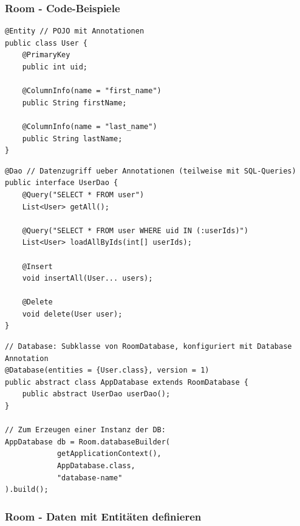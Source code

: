\documentclass[a4paper]{article}
\begin{document}
\newpage

\subsubsection{Room - Code-Beispiele}

\begin{lstlisting}
@Entity // POJO mit Annotationen
public class User {
	@PrimaryKey
	public int uid;
	
	@ColumnInfo(name = "first_name")
	public String firstName;
	
	@ColumnInfo(name = "last_name")
	public String lastName;
}
\end{lstlisting}

\begin{lstlisting}
@Dao // Datenzugriff ueber Annotationen (teilweise mit SQL-Queries)
public interface UserDao {
	@Query("SELECT * FROM user") 
	List<User> getAll(); 
	
	@Query("SELECT * FROM user WHERE uid IN (:userIds)") 
	List<User> loadAllByIds(int[] userIds); 
	
	@Insert 
	void insertAll(User... users); 
	
	@Delete 
	void delete(User user);
}
\end{lstlisting}

\begin{lstlisting}
// Database: Subklasse von RoomDatabase, konfiguriert mit Database Annotation
@Database(entities = {User.class}, version = 1)
public abstract class AppDatabase extends RoomDatabase {
	public abstract UserDao userDao();
}

// Zum Erzeugen einer Instanz der DB:
AppDatabase db = Room.databaseBuilder(
			getApplicationContext(),
			AppDatabase.class,
			"database-name"
).build();
\end{lstlisting}

\newpage

\subsubsection{Room - Daten mit Entitäten definieren}
\end{document}

